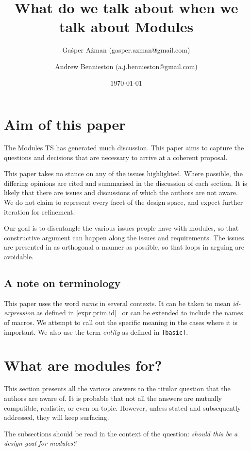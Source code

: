 \documentclass[reqno]{article}
\title{What do we talk about when we talk about Modules}
\author{Gašper Ažman \small{(gasper.azman@gmail.com)}
\and Andrew Bennieston \small{(a.j.bennieston@gmail.com)}}
\date{\today}
\begin{document}
\maketitle
\section{Aim of this paper}

The Modules TS \citep{N4667} has generated much discussion. This paper aims to
capture the questions and decisions that are necessary to arrive at a coherent
proposal.

This paper takes no stance on any of the issues highlighted. Where possible,
the differing opinions are cited and summarised in the discussion of each
section. It is likely that there are issues and discussions of which the
authors are not aware. We do not claim to represent every facet of the design
space, and expect further iteration for refinement.

Our goal is to disentangle the various issues people have with modules, so that
constructive argument can happen along the issues and requirements. The issues
are presented in as orthogonal a manner as possible, so that loops in arguing
are avoidable.

\subsection{A note on terminology}

This paper uses the word \emph{name} in several contexts. It can be taken to
mean \emph{id-expression} as defined in [expr.prim.id]~\citep{N4659} or can
be extended to include the names of macros. We attempt to call out the specific
meaning in the cases where it is important. We also use the term \emph{entity}
as defined in \texttt{[basic]}.~\citep{N4659}

\section{What are modules for?}

This section presents all the various answers to the titular question that the
authors are aware of. It is probable that not all the answers are mutually
compatible, realistic, or even on topic. However, unless stated and
subsequently addressed, they will keep surfacing.

The subsections should be read in the context of the question: \emph{should
this be a design goal for modules?}
\end{document}
